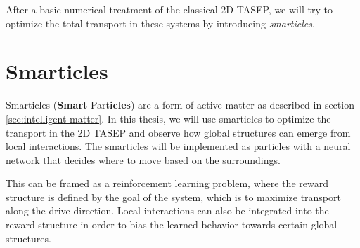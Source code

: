 After a basic numerical treatment of the classical 2D TASEP, we will try to optimize the total transport in these systems by introducing \textit{smarticles}. 

\section{Smarticles}
\label{sec:smarticles}
Smarticles (\textbf{Smart} Part\textbf{icles}) are a form of active matter as described in section \ref{sec:intelligent-matter}. In this thesis, we will use smarticles to optimize the transport in the 2D TASEP and observe how global structures can emerge from local interactions. The smarticles will be implemented as particles with a neural network that decides where to move based on the surroundings. 


This can be framed as a reinforcement learning problem, where the reward structure is defined by the goal of the system, which is to maximize transport along the drive direction. Local interactions can also be integrated into the reward structure in order to bias the learned behavior towards certain global structures.  